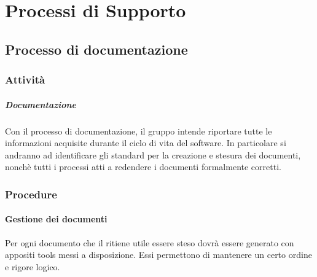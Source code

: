 %


\section{Processi di Supporto}

	\subsection{Processo di documentazione}
	
		\subsubsection{Attività}

			\subparagraph{Documentazione}
			Con il processo di documentazione, il gruppo \groupName intende riportare tutte le informazioni acquisite durante il ciclo di vita del software.
			In particolare si andranno ad identificare gli standard per la creazione e stesura dei documenti, nonchè tutti i processi atti a redendere i documenti formalmente corretti.

		\subsubsection{Procedure}

			\paragraph{Gestione dei documenti}
			Per ogni documento che il \roleProjectManager ritiene utile essere steso dovrà essere generato con appositi tools messi a disposizione. Essi permettono di mantenere un certo ordine e rigore logico.  

